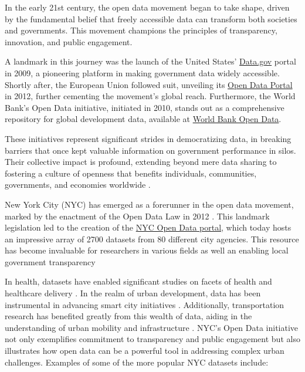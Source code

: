 \documentclass[12pt, titlepage]{article}
\begin{document}
In the early 21st century, the open data movement began to take shape, driven by the 
fundamental belief that freely accessible data can transform 
both societies and governments. This movement champions the principles of 
transparency, innovation, and public engagement. 

A landmark in this journey was the launch of the United States'
\href{https://www.data.gov}{Data.gov} portal in 2009, a pioneering
platform in making government data widely accessible. Shortly after,
the European Union followed suit, unveiling its
\href{https://data.europa.eu/euodp}{Open Data Portal} in 2012, further
cementing the movement's global reach. Furthermore, the World Bank's Open
Data initiative, initiated in 2010, stands out as a comprehensive
repository for global development data, available at
\href{https://data.worldbank.org}{World Bank Open Data}. 

These initiatives represent significant strides in democratizing data, in breaking barriers that once
kept valuable information on government performance in silos. Their collective impact is profound, extending beyond
mere data sharing to fostering a culture of openness that benefits
individuals, communities, governments, and economies worldwide
\citep{barns2016mine, wang2016adoption}.

New York City (NYC) has emerged as a forerunner in the open data
movement, marked by the enactment of the Open Data Law in 2012
\citep{zuiderwijk2014open}. This landmark legislation led to the
creation of the \href{https://opendata.cityofnewyork.us}{NYC Open Data
  portal}, which today hosts an impressive array of 2700 datasets
from 80 different city agencies. This resource has become invaluable
for researchers in various fields as well an enabling local government transparency

In health, datasets have enabled
significant studies on facets of health and healthcare delivery
\citep{cantor2018facets, shankar2021data}. In the realm of urban
development, data has been instrumental in advancing smart city
initiatives \citep{neves2020impacts}. Additionally, transportation
research has benefited greatly from this wealth of data, aiding in the
understanding of urban mobility and infrastructure
\citep{gerte2019understanding}. NYC's Open Data initiative not only
exemplifies commitment to transparency and public engagement but also
illustrates how open data can be a powerful tool in addressing complex
urban challenges. Examples of some of the more popular NYC datasets include:
\end{document}
